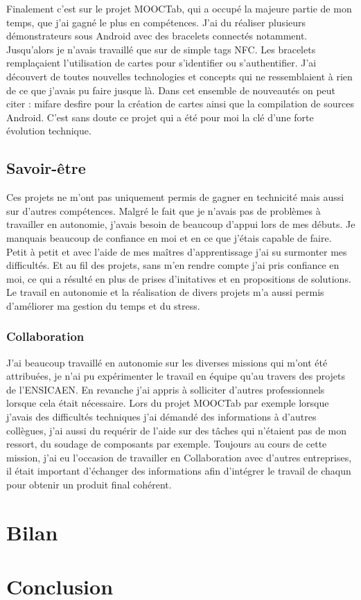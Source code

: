 \documentclass[french,12pt,a4paper,titlepage,openright,openbib]{report}
\begin{document}
Finalement c'est sur le projet MOOCTab, qui a occupé la majeure partie de mon temps, que j'ai gagné le plus en compétences. J'ai du réaliser plusieurs démonstrateurs sous Android avec des bracelets connectés notamment. Jusqu'alors je n'avais travaillé que sur de simple tags NFC. Les bracelets remplaçaient l'utilisation de cartes pour s'identifier ou s'authentifier. J'ai découvert de toutes nouvelles technologies et concepts qui ne ressemblaient à rien de ce que j'avais pu faire jusque là.
Dans cet ensemble de nouveautés on peut citer : \gls{mifare} \gls{desfire} pour la création de cartes ainsi que la compilation de sources Android. C'est sans doute ce projet qui a été pour moi la clé d'une forte évolution technique.
\section{Savoir-être}
Ces projets ne m'ont pas uniquement permis de gagner en technicité mais aussi sur d'autres compétences.
Malgré le fait que je n'avais pas de problèmes à travailler en autonomie, j'avais besoin de beaucoup d'appui lors de mes débuts. Je manquais beaucoup de confiance en moi et en ce que j'étais capable de faire. Petit à petit et avec l'aide de mes maîtres d'apprentissage j'ai su surmonter mes difficultés.
Et au fil des projets, sans m'en rendre compte j'ai pris confiance en moi, ce qui a résulté en plus de prises d'initatives et en propositions de solutions.
Le travail en autonomie et la réalisation de divers projets m'a aussi permis d'améliorer ma gestion du temps et du stress.
\subsection{Collaboration}
J'ai beaucoup travaillé en autonomie sur les diverses missions qui m'ont été attribuées, je n'ai pu expérimenter le travail en équipe qu'au travers des projets de l'ENSICAEN. En revanche j'ai appris à solliciter d'autres professionnels lorsque cela était nécessaire. Lors du projet MOOCTab par exemple lorsque j'avais des difficultés techniques j'ai démandé des informations à d'autres collègues, j'ai aussi du requérir de l'aide sur des tâches qui n'étaient pas de mon ressort, du soudage de composants par exemple. Toujours au cours de cette mission, j'ai eu l'occasion de travailler en Collaboration avec d'autres entreprises, il était important d'échanger des informations afin d'intégrer le travail de chaqun pour obtenir un produit final cohérent.
\chapter{Bilan}
\lipsum[6-7]
\chapter{Conclusion}
\lipsum[8-9]

\printglossary[title={Glossaire}]



	
\end{document}
